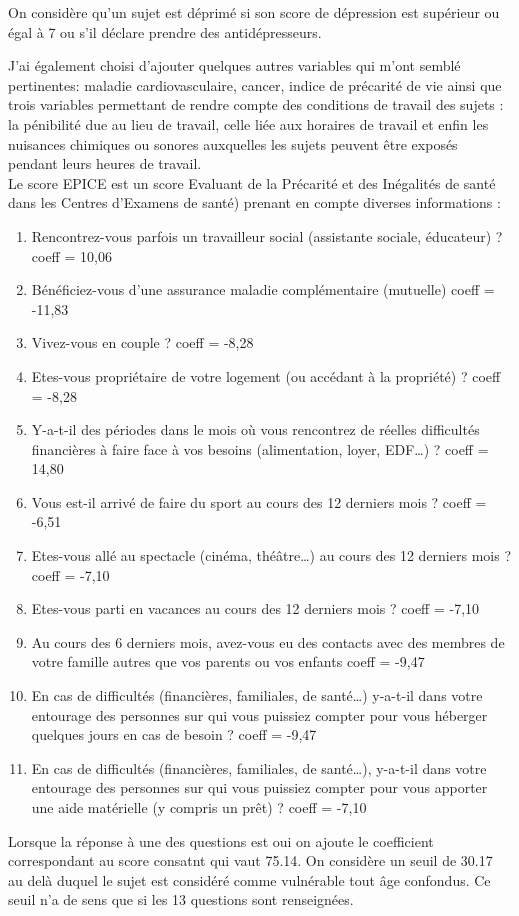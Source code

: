 \documentclass{book}
\begin{document}
\noindent
On considère qu'un sujet est déprimé si son score de dépression est supérieur ou égal à 7 ou s'il déclare prendre des antidépresseurs.\\

\smallskip

\noindent
J'ai également choisi d'ajouter quelques autres variables qui m'ont semblé pertinentes: maladie cardiovasculaire, cancer, indice de précarité de vie ainsi que trois variables permettant de rendre compte des conditions de travail des sujets : la pénibilité due au lieu de travail, celle liée aux horaires de travail et enfin les nuisances chimiques ou sonores auxquelles les sujets peuvent être exposés pendant leurs heures de travail.\\

\bigskip
\noindent
Le score EPICE est un score Evaluant de la Précarité et des Inégalités de santé dans les Centres d'Examens
de santé) prenant en compte diverses informations :
\begin{enumerate}
\item Rencontrez-vous parfois un travailleur social (assistante sociale, éducateur) ? coeff = 10,06
\item Bénéficiez-vous d'une assurance maladie complémentaire (mutuelle) coeff = -11,83
\item Vivez-vous en couple ? coeff = -8,28
\item Etes-vous propriétaire de votre logement (ou accédant à la propriété) ? coeff = -8,28
\item Y-a-t-il des périodes dans le mois où vous rencontrez de réelles difficultés financières à faire face à vos besoins (alimentation, loyer, EDF…) ? coeff = 14,80
\item Vous est-il arrivé de faire du sport au cours des 12 derniers mois ? coeff = -6,51
\item Etes-vous allé au spectacle (cinéma, théâtre…) au cours des 12 derniers mois ? coeff = -7,10
\item Etes-vous parti en vacances au cours des 12 derniers mois ? coeff = -7,10
\item Au cours des 6 derniers mois, avez-vous eu des contacts avec des membres de votre famille autres que vos parents ou vos enfants coeff = -9,47
\item En cas de difficultés (financières, familiales, de santé…) y-a-t-il dans votre entourage des personnes sur qui vous puissiez compter pour vous héberger quelques jours en cas de besoin ? coeff = -9,47
\item En cas de difficultés (financières, familiales, de santé…), y-a-t-il dans votre entourage des personnes sur qui vous puissiez compter pour vous apporter une aide matérielle (y compris un prêt) ? coeff = -7,10
\end{enumerate}
Lorsque la réponse à une des questions est oui on ajoute le coefficient correspondant au score consatnt qui vaut 75.14. On considère un seuil de 30.17 au delà duquel le sujet est considéré comme vulnérable tout âge confondus. Ce seuil n'a de sens que si les 13 questions sont renseignées.\\
\end{document}
